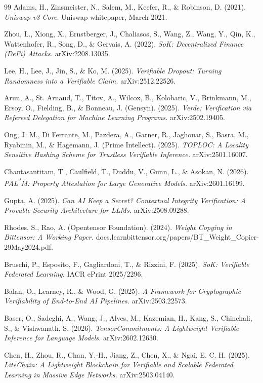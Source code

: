 \documentclass[11pt]{article}
\begin{document}
\begin{thebibliography}{99}
 Adams, H., Zinsmeister, N., Salem, M., Keefer, R., \& Robinson, D. (2021). \emph{Uniswap v3 Core.} Uniswap whitepaper, March 2021.

 Zhou, L., Xiong, X., Ernstberger, J., Chaliasos, S., Wang, Z., Wang, Y., Qin, K., Wattenhofer, R., Song, D., \& Gervais, A. (2022). \emph{SoK: Decentralized Finance (DeFi) Attacks.} arXiv:2208.13035.

 Lee, H., Lee, J., Jin, S., \& Ko, M. (2025). \emph{Verifiable Dropout: Turning Randomness into a Verifiable Claim.} arXiv:2512.22526.

 Arun, A., St. Arnaud, T., Titov, A., Wilcox, B., Kolobaric, V., Brinkmann, M., Ersoy, O., Fielding, B., \& Bonneau, J. (Gensyn). (2025). \emph{Verde: Verification via Refereed Delegation for Machine Learning Programs.} arXiv:2502.19405.

 Ong, J. M., Di Ferrante, M., Pazdera, A., Garner, R., Jaghouar, S., Basra, M., Ryabinin, M., \& Hagemann, J. (Prime Intellect). (2025). \emph{TOPLOC: A Locality Sensitive Hashing Scheme for Trustless Verifiable Inference.} arXiv:2501.16007.

 Chantasantitam, T., Caulfield, T., Duddu, V., Gunn, L., \& Asokan, N. (2026). \emph{PAL\textsuperscript{*}M: Property Attestation for Large Generative Models.} arXiv:2601.16199.

 Gupta, A. (2025). \emph{Can AI Keep a Secret? Contextual Integrity Verification: A Provable Security Architecture for LLMs.} arXiv:2508.09288.

 Rhodes, S., Rao, A. (Opentensor Foundation). (2024). \emph{Weight Copying in Bittensor: A Working Paper.} docs.learnbittensor.org/papers/BT\_Weight\_Copier-29May2024.pdf.

 Bruschi, P., Esposito, F., Gagliardoni, T., \& Rizzini, F. (2025). \emph{SoK: Verifiable Federated Learning.} IACR ePrint 2025/2296.

 Balan, O., Learney, R., \& Wood, G. (2025). \emph{A Framework for Cryptographic Verifiability of End-to-End AI Pipelines.} arXiv:2503.22573.

 Baser, O., Sadeghi, A., Wang, J., Alves, M., Kazemian, H., Kang, S., Chinchali, S., \& Vishwanath, S. (2026). \emph{TensorCommitments: A Lightweight Verifiable Inference for Language Models.} arXiv:2602.12630.

 Chen, H., Zhou, R., Chan, Y.-H., Jiang, Z., Chen, X., \& Ngai, E. C. H. (2025). \emph{LiteChain: A Lightweight Blockchain for Verifiable and Scalable Federated Learning in Massive Edge Networks.} arXiv:2503.04140.


\end{thebibliography}
\end{document}
